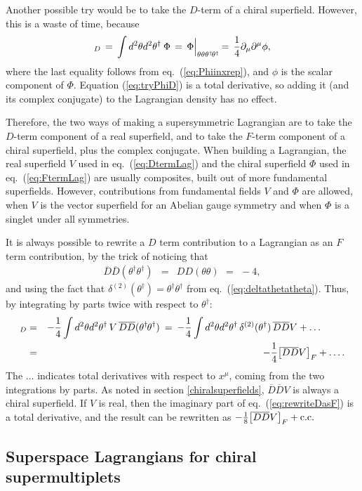 \documentclass[11pt]{article}
\newcommand{\thdthd}{\theta^\dagger\hspace{-1pt}\theta^\dagger}
\def\beq{\begin{eqnarray}}
\def\eeq{\end{eqnarray}}
\def\Dcon{\overline D}
\begin{document}
Another possible try would be to take the $D$-term of a chiral superfield. However,
this is a waste of time, because
\beq
[\Phi]_D 
\,=\, \int d^2\theta d^2\theta^\dagger\> \Phi 
\,=\, 
\Phi \Bigl |_{\theta\theta\thdthd}
\,=\,
\frac{1}{4} \partial_\mu \partial^\mu \phi,
\label{eq:tryPhiD}
\eeq
where the last equality follows from eq.~(\ref{eq:Phiinxrep}), and
$\phi$ is the scalar component of $\Phi$. Equation (\ref{eq:tryPhiD})
is a total derivative, so adding it (and its complex conjugate) to the Lagrangian
density has no effect.

Therefore, the two ways of making a supersymmetric Lagrangian are to take the
$D$-term component of a real superfield, and to take the $F$-term component of
a chiral superfield, plus the complex conjugate.
When building a Lagrangian, the real superfield $V$ used in 
eq.~(\ref{eq:DtermLag}) and the chiral superfield $\Phi$ used in 
eq.~(\ref{eq:FtermLag}) are usually composites, built out of more 
fundamental superfields. However, contributions from fundamental 
fields $V$ and $\Phi$ are allowed, when $V$ is the vector superfield for 
an Abelian gauge symmetry and when $\Phi$ is a singlet under all 
symmetries.

It is always possible to rewrite a $D$ term contribution to a Lagrangian
as an $F$ term contribution, by the trick of noticing that
\beq
\Dcon\Dcon (\theta^\dagger \theta^\dagger) &=& 
DD(\theta\theta) \>\,=\,\> -4,
\label{eq:DDthetatheta}
\eeq
and using the fact that $\delta^{(2)}(\theta^\dagger) = 
\theta^\dagger\theta^\dagger$ 
from eq.~(\ref{eq:deltathetatheta}).
Thus, by integrating by parts twice with respect to $\theta^\dagger$:
\beq
[V]_D
&=&
-\frac{1}{4} \int d^2\theta d^2\theta^\dagger\, V
\,
\Dcon\Dcon (\thdthd)
\>=\>
-\frac{1}{4} \int d^2\theta d^2\theta^\dagger\,
\delta^{(2)}(\theta^\dagger) \, 
\Dcon\Dcon V 
+ \ldots\phantom{xxxx}
\label{eq:rewriteDasFz}
\\
&=&
-\frac{1}{4} \bigl [\Dcon\Dcon V \bigr ]_F 
+ 
\ldots.
\label{eq:rewriteDasF}
\eeq
The $\ldots$ indicates total derivatives with respect to $x^\mu$,
coming from the two integrations by parts. As noted in section \ref{chiralsuperfields},
$\Dcon\Dcon V$ is always a chiral superfield.
If $V$ is real, then the imaginary part of eq.~(\ref{eq:rewriteDasF}) 
is a total derivative, and the result can be rewritten as
$-\frac{1}{8} \bigl [\Dcon\Dcon V \bigr ]_F + {\rm c.c.}$

\subsection{Superspace Lagrangians for chiral supermultiplets\label{superspacelagrchiral}}
\setcounter{equation}{0}
\setcounter{footnote}{2}
\end{document}
